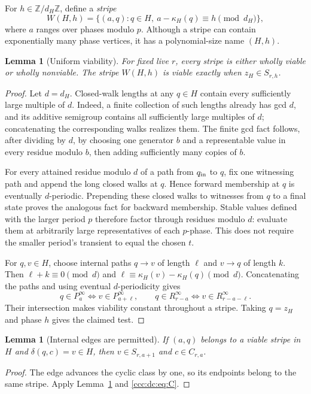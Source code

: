 \documentclass[11pt,letterpaper]{article}
\newtheorem{lemma}[theorem]{Lemma}
\theoremstyle{definition}
\theoremstyle{remark}
\begin{document}
For $h\in\mathbb Z/d_H\mathbb Z$, define a \emph{stripe}
\[
W(H,h)=\{(a,q):q\in H,\ a-\kappa_H(q)\equiv h\pmod{d_H}\},
\]
where $a$ ranges over phases modulo $p$. Although a stripe can contain exponentially many phase vertices, it has a polynomial-size name $(H,h)$.

\begin{lemma}[Uniform viability]\label{ccc:dc:lem:viability}
For fixed live $r$, every stripe is either wholly viable or wholly nonviable. The stripe $W(H,h)$ is viable exactly when $z_H\in S_{r,h}$.
\end{lemma}
\begin{proof}
Let $d=d_H$. Closed-walk lengths at any $q\in H$ contain every sufficiently large multiple of $d$. Indeed, a finite collection of such lengths already has gcd $d$, and its additive semigroup contains all sufficiently large multiples of $d$; concatenating the corresponding walks realizes them. The finite gcd fact follows, after dividing by $d$, by choosing one generator $b$ and a representable value in every residue modulo $b$, then adding sufficiently many copies of $b$.

For every attained residue modulo $d$ of a path from $q_{\rm in}$ to $q$, fix one witnessing path and append the long closed walks at $q$. Hence forward membership at $q$ is eventually $d$-periodic. Prepending these closed walks to witnesses from $q$ to a final state proves the analogous fact for backward membership. Stable values defined with the larger period $p$ therefore factor through residues modulo $d$: evaluate them at arbitrarily large representatives of each $p$-phase. This does not require the smaller period's transient to equal the chosen $t$.

For $q,v\in H$, choose internal paths $q\to v$ of length $\ell$ and $v\to q$ of length $k$. Then $\ell+k\equiv0\pmod d$ and $\ell\equiv\kappa_H(v)-\kappa_H(q)\pmod d$. Concatenating the paths and using eventual $d$-periodicity gives
\[
q\in P^\infty_a\iff v\in P^\infty_{a+\ell},\qquad
q\in R^\infty_{r-a}\iff v\in R^\infty_{r-a-\ell}.
\]
Their intersection makes viability constant throughout a stripe. Taking $q=z_H$ and phase $h$ gives the claimed test.
\end{proof}

\begin{lemma}[Internal edges are permitted]\label{ccc:dc:lem:edges}
If $(a,q)$ belongs to a viable stripe in $H$ and $\delta(q,c)=v\in H$, then $v\in S_{r,a+1}$ and $c\in C_{r,a}$.
\end{lemma}
\begin{proof}
The edge advances the cyclic class by one, so its endpoints belong to the same stripe. Apply Lemma~\ref{ccc:dc:lem:viability} and \eqref{ccc:dc:eq:C}.
\end{proof}
\end{document}
